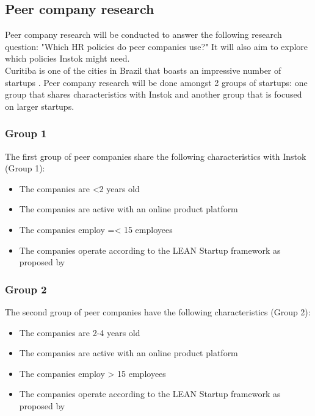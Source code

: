 \documentclass[man]{apa6}
\begin{document}
\subsection{Peer company research}
Peer company research will be conducted to answer the following research question: "Which HR policies do peer companies use?" It will also aim to explore which policies Instok might need.\\

Curitiba is one of the cities in Brazil that boasts an impressive number of startups \parencite{SANTANA2016}.
Peer company research will be done amongst 2 groups of startups: one group that shares characteristics with Instok and another group that is focused on larger startups. \\

\subsubsection{Group 1} The first group of peer companies share the following characteristics with Instok (Group 1):
\begin{itemize}
\item The companies are <2 years old
\item The companies are active with an online product platform
\item The companies employ =< 15 employees
\item The companies operate according to the LEAN Startup framework as proposed by \cite{RIES2011}
\end{itemize}

\subsubsection{Group 2} The second group of peer companies have the following characteristics (Group 2):
\begin{itemize}
\item The companies are 2-4 years old
\item The companies are active with an online product platform
\item The companies employ > 15 employees
\item The companies operate according to the LEAN Startup framework as proposed by \cite{RIES2011}
\end{itemize}
\end{document}
